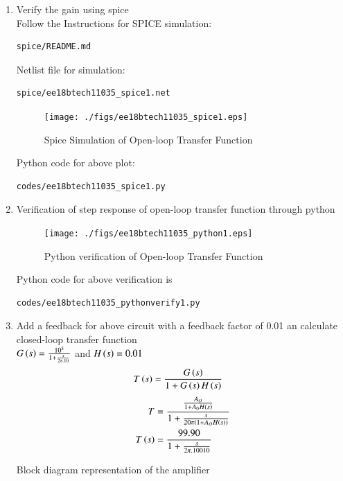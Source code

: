 \begin{enumerate}[label=\thesubsection.\arabic*.,ref=\thesubsection.\theenumi]
\item Verify the gain using spice\\
\solution Follow the Instructions for SPICE simulation:
\begin{lstlisting}
spice/README.md
\end{lstlisting}
Netlist file for simulation:
\begin{lstlisting}
spice/ee18btech11035_spice1.net
\end{lstlisting}

\begin{figure}[!h]
  \texttt{[image: ./figs/ee18btech11035\_spice1.eps]}
  \caption{Spice Simulation of Open-loop Transfer Function}
  \label{fig:ee18btech11035_spice1}
\end{figure}


Python code for above plot:
\begin{lstlisting}
codes/ee18btech11035_spice1.py
\end{lstlisting}

\item Verification of step response of open-loop transfer function through python\\
\solution 
\begin{figure}[!h]
  \texttt{[image: ./figs/ee18btech11035\_python1.eps]}
  \caption{Python verification of Open-loop Transfer Function}
  \label{fig:ee18btech11035_pv1}
\end{figure}

Python code for above verification is 
\begin{lstlisting}
codes/ee18btech11035_pythonverify1.py
\end{lstlisting}


\item Add a feedback for above circuit with a feedback factor of 0.01 an calculate closed-loop transfer function\\
\solution $G\left(s\right)=\frac{10^5}{1+\frac{s}{2\pi.10}}$ and $H\left(s\right)=0.01$
\begin{align}
    T\left(s\right)&=\frac{G\left(s\right)}{1+G\left(s\right)H\left(s\right)}
\end{align}
\begin{align}
    T&=\frac{\frac{A_{O}}{1+A_{0}H\left(s\right)}}{1+\frac{s}{20\pi\left(1+A_{O}H\left(s\right)\right)}}\\
    T\left(s\right)&=\frac{99.90}{1+\frac{s}{2\pi.10010}}
\end{align}





Block diagram representation of the amplifier
\begin{figure}[!ht]
    \begin{center}
		\resizebox{\columnwidth}{!}{}
	\end{center}
\caption{}
\label{fig:ee18btech11035_block}
\end{figure}


\end{enumerate}
